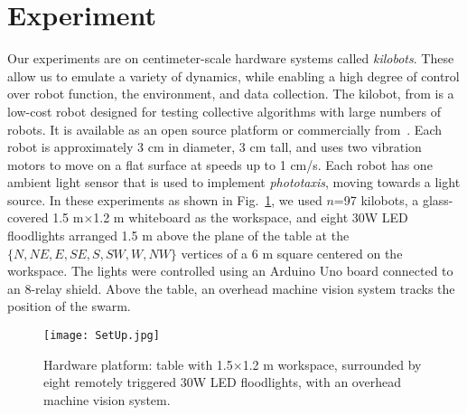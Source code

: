 
\section{Experiment}\label{sec:expResults}





Our experiments are on centimeter-scale hardware systems called \emph{kilobots}.  These allow us to emulate a variety of dynamics, while enabling a high degree of control over robot function, the environment, and data collection. The kilobot, from \cite{Rubenstein2012,rubenstein2014programmable} is a low-cost robot designed for testing collective algorithms with large numbers of robots. It is available as an open source platform or commercially from~\cite{K-Team2015}.  Each robot is approximately 3 cm in diameter, 3 cm tall, and uses two vibration motors to move on a flat surface at speeds up to 1 cm/s.  Each robot has one ambient light sensor that is used to implement \emph{phototaxis},  moving towards a light source. 
In these experiments as shown in Fig.~\ref{fig:setup}, we used $n$=97 kilobots, a glass-covered 1.5 m$\times$1.2 m whiteboard as the workspace, and eight 30W LED floodlights arranged 1.5 m above the plane of the table at the $\{N,NE,E,SE,S,SW,W,NW\}$ vertices of a 6 m square centered on the workspace. The lights were controlled using an Arduino Uno board connected to an 8-relay shield.  Above  the table, an overhead machine vision system tracks the position of the swarm.


\begin{figure}
\begin{center}
	\texttt{[image: SetUp.jpg]}
\end{center}
\vspace{-1em}
\caption{\label{fig:setup}
Hardware platform:  table with 1.5$\times$1.2 m workspace, surrounded by eight remotely triggered 30W LED floodlights, with an overhead machine vision system.
}
\vspace{-1.5em}
\end{figure}

